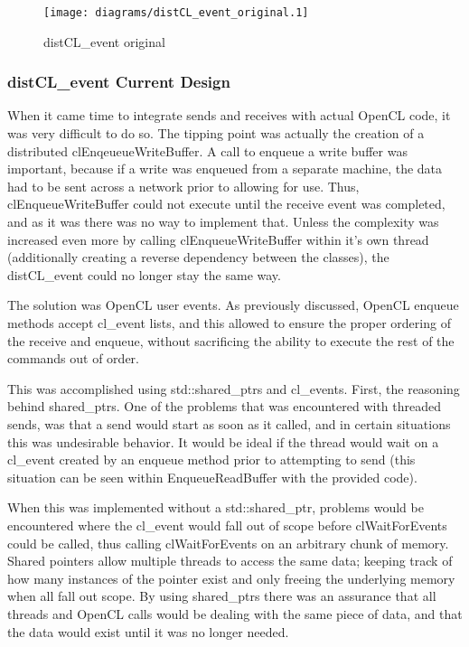 \documentclass[../thesis.tex]{subfiles}
\begin{document}
            \begin{figure}[htbp]
                \centering
                \texttt{[image: diagrams/distCL\_event\_original.1]}
                \caption{distCL\_event original}
                \label{fig:distCL_event_uml_original}
            \end{figure}
            
        
        \subsubsection{distCL\_event Current Design} %
        \label{ssub:distcl_event_current_design}
            When it came time to integrate sends and receives with actual OpenCL code, it was very difficult to do so. The tipping point was actually the creation of a distributed clEnqeueueWriteBuffer. A call to enqueue a write buffer was important, because if a write was enqueued from a separate machine, the data had to be sent across a network prior to allowing for use. Thus, clEnqueueWriteBuffer could not execute until the receive event was completed, and as it was there was no way to implement that. Unless the complexity was increased even more by calling clEnqueueWriteBuffer within it's own thread (additionally creating a reverse dependency between the classes), the distCL\_event could no longer stay the same way.

            The solution was OpenCL user events. As previously discussed, OpenCL enqueue methods accept cl\_event lists, and this allowed to ensure the proper ordering of the receive and enqueue, without sacrificing the ability to execute the rest of the commands out of order.

            This was accomplished using std::shared\_ptrs and cl\_events. First, the reasoning behind shared\_ptrs. One of the problems that was encountered  with threaded sends, was that a send would start as soon as it called, and in certain situations this was undesirable behavior. It would be ideal if the thread would wait on a cl\_event created by an enqueue method prior to attempting to send (this situation can be seen within EnqueueReadBuffer with the provided code). 

            When this was implemented without a std::shared\_ptr, problems would be encountered where the cl\_event would fall out of scope before clWaitForEvents could be called, thus calling clWaitForEvents on an arbitrary chunk of memory. Shared pointers allow multiple threads to access the same data; keeping track of how many instances of the pointer exist and only freeing the underlying memory when all fall out scope. By using shared\_ptrs there was an assurance that all threads and OpenCL calls would be dealing with the same piece of data, and that the data would exist until it was no longer needed.
\end{document}
